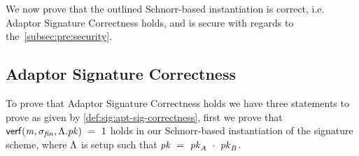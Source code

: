 We now prove that the outlined Schnorr-based instantiation is correct, i.e. Adaptor Signature Correctness holds, and is secure with regards to the~\cref{subsec:pre:security}.

\subsection{Adaptor Signature Correctness}\label{subsec:sig:aptsig-correctness}

To prove that Adaptor Signature Correctness holds we have three statements to prove as given by \cref{def:sig:apt-sig-correctness}, first we prove that $\mathsf{verf}(\mathit{m}, \sigma_{\mathit{fin}}, \Lambda.\mathit{pk}) ~=~ 1$ holds in our Schnorr-based instantiation of the signature scheme, where $\Lambda$ is setup such that $\mathit{pk} ~=~ \mathit{pk}_{\mathit{A}} ~\cdot~ \mathit{pk}_{\mathit{B}}$.

